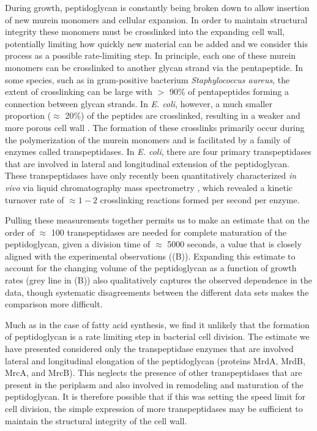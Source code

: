 During growth, peptidoglycan is constantly being broken down to allow insertion
of new murein monomers and cellular expansion. In order to maintain structural
integrity these monomers must be crosslinked into the expanding cell wall,
potentially limiting how quickly new material can be added and we consider this
process as a possible rate-limiting step. In principle,  each one of these
murein monomers can be crosslinked to another glycan strand via the
pentapeptide.  In some species, such as in gram-positive bacterium
\textit{Staphylococcus aureus}, the extent of crosslinking can be large with $>$
90\% of pentapeptides forming a connection between glycan strands. In \textit{E.
coli}, however, a much smaller proportion ($\approx$ 20\%) of the peptides are
crosslinked, resulting in a weaker and more porous cell wall \cite{vollmer2008a,
rogers1980}.  The formation of these crosslinks primarily occur during the
polymerization of the murein monomers and is facilitated by a family of enzymes
called transpeptidases. In \textit{E. coli}, there are four primary
transpeptidases that are involved in lateral and longitudinal extension of the
peptidoglycan. These transpeptidases have only recently been quantitatively
characterized \textit{in vivo} via liquid chromatography mass spectrometry
\citep{catherwood2020}, which revealed a kinetic turnover rate of $\approx 1 -
2$ crosslinking reactions formed per second per enzyme.

Pulling these measurements together permits us to make an estimate that on the
order of $\approx$ 100 transpeptidases are needed for complete maturation of the
peptidoglycan, given a division time of $\approx$ 5000 seconds, a value that is
closely aligned with the experimental observations ((B)). Expanding this
estimate to account for the changing volume of the peptidoglycan as a function
of growth rates (grey line in (B)) also qualitatively captures the observed
dependence in the data, though systematic disagreements between the different
data sets makes the comparison more difficult.

Much as in the case of fatty acid synthesis, we find it unlikely that the
formation of peptidoglycan is a rate limiting step in bacterial cell division.
The estimate we have presented considered only the transpeptidase enzymes that
are involved lateral and longitudinal elongation of the peptidoglycan (proteins
MrdA, MrdB, MrcA, and MrcB). This neglects the presence of other transpeptidases
that are present in the periplasm and also involved in remodeling and maturation
of the peptidoglycan. It is therefore possible that if this was setting the
speed limit for cell division, the simple expression of more
transpeptidases may be sufficient to maintain the structural integrity of the
cell wall.

